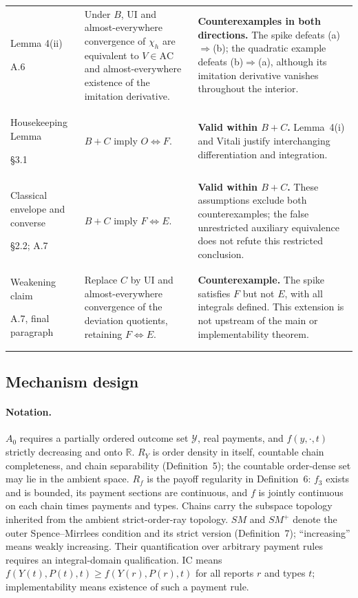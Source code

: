 \documentclass[11pt]{article}
\theoremstyle{remark}\newtheorem{remark}[theorem]{Remark}
\begin{document}
\begin{longtable}{@{}>{\raggedright\arraybackslash}p{2.60cm}>{\raggedright\arraybackslash}p{6.30cm}>{\raggedright\arraybackslash}p{6.45cm}@{}}
Lemma 4(ii)\par A.6
& Under $B$, UI and almost-everywhere convergence of $\chi_h$ are equivalent to $V\in\mathrm{AC}$ and almost-everywhere existence of the imitation derivative.
& \textbf{Counterexamples in both directions.} The spike defeats (a)$\Rightarrow$(b); the quadratic example defeats (b)$\Rightarrow$(a), although its imitation derivative vanishes throughout the interior. \\
Housekeeping Lemma\par \S3.1
& $B+C$ imply $O\iff F$.
& \textbf{Valid within $B+C$.} Lemma~4(i) and Vitali justify interchanging differentiation and integration. \\
Classical envelope and converse\par \S2.2; A.7
& $B+C$ imply $F\iff E$.
& \textbf{Valid within $B+C$.} These assumptions exclude both counterexamples; the false unrestricted auxiliary equivalence does not refute this restricted conclusion. \\
Weakening claim\par A.7, final paragraph
& Replace $C$ by UI and almost-everywhere convergence of the deviation quotients, retaining $F\iff E$.
& \textbf{Counterexample.} The spike satisfies $F$ but not $E$, with all integrals defined. This extension is not upstream of the main or implementability theorem. \\
\end{longtable}
\endgroup
\FloatBarrier


\subsection{Mechanism design}
\label{sec:audit-mechanism-tables}

\paragraph{Notation.}
$A_0$ requires a partially ordered outcome set $\mathcal Y$, real payments,
and $f(y,\cdot,t)$ strictly decreasing and onto $\mathbb R$.
$R_Y$ is order density in itself, countable chain completeness, and chain
separability (Definition~5); the countable order-dense set may lie in the
ambient space.  $R_f$ is the payoff regularity in Definition~6: $f_3$ exists
and is bounded, its payment sections are continuous, and $f$ is jointly
continuous on each chain times payments and types.  Chains carry the
subspace topology inherited from the ambient strict-order-ray topology.
$SM$ and $SM^+$ denote the outer Spence--Mirrlees condition and its strict
version (Definition~7); ``increasing'' means weakly increasing. Their
quantification over arbitrary payment rules requires an integral-domain
qualification. IC means
$f(Y(t),P(t),t)\geq f(Y(r),P(r),t)$ for all reports $r$ and types $t$;
implementability means existence of such a payment rule.
\end{document}
